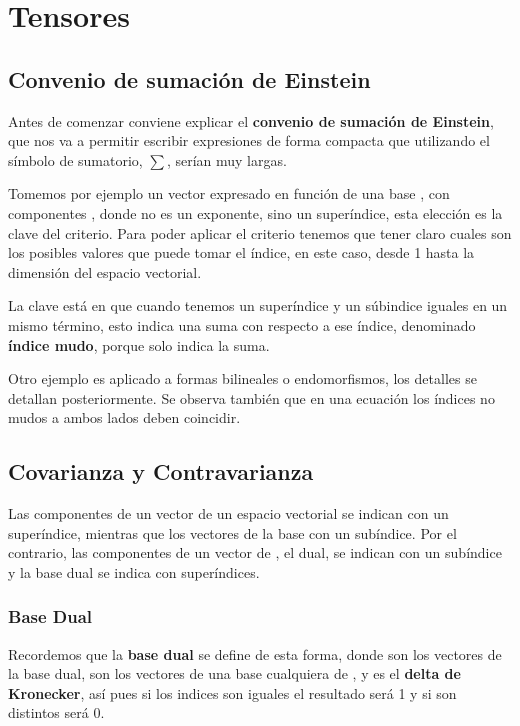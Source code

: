 \section{Tensores}
\subsection{Convenio de sumación de Einstein}
Antes de comenzar conviene explicar el \textbf{convenio de sumación de Einstein}, que nos va a permitir escribir expresiones de forma compacta que utilizando el símbolo de sumatorio, $\sum$, serían muy largas.

Tomemos por ejemplo un vector  expresado en función de una base , con componentes , donde  no es un exponente, sino un superíndice, esta elección es la clave del criterio.
\lrg{\[\bm{v}=\sum_{i=1}^n{v^i \bm{e}_i}=\sum{v^i \bm{e}_i}\equiv v^i \bm{e}_i\]}
Para poder aplicar el criterio tenemos que tener claro cuales son los posibles valores que puede tomar el índice, en este caso, desde 1 hasta la dimensión del espacio vectorial.

La clave está en que cuando tenemos un superíndice y un súbindice iguales en un mismo término, esto indica una suma con respecto a ese índice, denominado \textbf{índice mudo}, porque solo indica la suma.

Otro ejemplo es aplicado a formas bilineales o endomorfismos, los detalles se detallan posteriormente.
\lrg{\[\phi(\bm{v},\bm{w})=A_{ij} v^i w^j \;\;\;\;\; {f(\bm{v})}^j={M^j}_i \ v^i\]}
Se observa también que en una ecuación los índices no mudos a ambos lados deben coincidir.
\subsection{Covarianza y Contravarianza}
Las componentes de un vector de un espacio vectorial  se indican con un superíndice, mientras que los vectores de la base con un subíndice. Por el contrario, las componentes de un vector de , el dual, se indican con un subíndice y la base dual se indica con superíndices.
\subsubsection{Base Dual}
\vspace{-25pt}
Recordemos que la \textbf{base dual} se define de esta forma, donde  son los vectores de la base dual,  son los vectores de una base cualquiera de , y  es el \textbf{delta de Kronecker}, así pues si los indices son iguales el resultado será 1 y si son distintos será 0.
